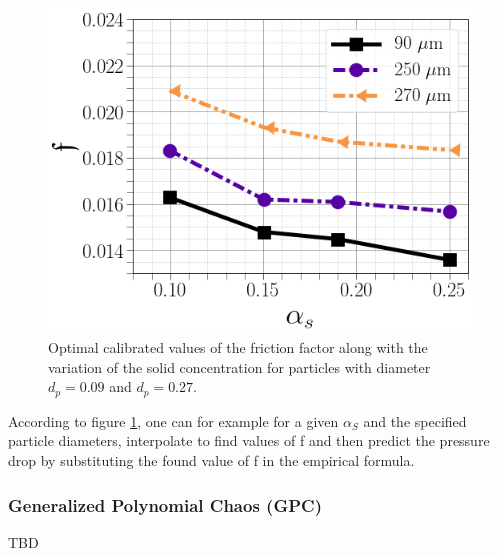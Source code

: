 \documentclass[11pt]{report}
\begin{document}
 \begin{figure}[ht!]
 \begin{center}
 \includegraphics[scale = 0.35]{figs/suur.png}
 \caption{Optimal calibrated values of the friction factor along with the variation of the solid concentration for particles with diameter $d_p=0.09$ and $d_p=0.27$.}
 \label{surro}
 \end{center}
 \end{figure}
 According to figure \ref{surro}, one can for example for a given $\alpha_S$ and the specified particle diameters, interpolate to find values of f and then predict the pressure drop by substituting the found value of f in the empirical formula.
 \subsubsection{Generalized Polynomial Chaos (GPC)}

TBD


\end{document}
